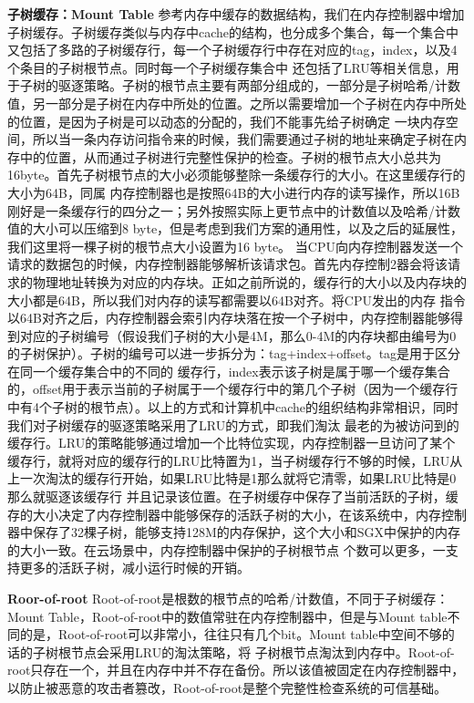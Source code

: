 \textbf{子树缓存：Mount Table}
参考内存中缓存的数据结构，我们在内存控制器中增加子树缓存。子树缓存类似与内存中cache的结构，也分成多个集合，每一个集合中又包括了多路的子树缓存行，每一个子树缓存行中存在对应的tag，index，以及4个条目的子树根节点。同时每一个子树缓存集合中
还包括了LRU等相关信息，用于子树的驱逐策略。子树的根节点主要有两部分组成的，一部分是子树哈希/计数值，另一部分是子树在内存中所处的位置。之所以需要增加一个子树在内存中所处的位置，是因为子树是可以动态的分配的，我们不能事先给子树确定
一块内存空间，所以当一条内存访问指令来的时候，我们需要通过子树的地址来确定子树在内存中的位置，从而通过子树进行完整性保护的检查。子树的根节点大小总共为16byte。首先子树根节点的大小必须能够整除一条缓存行的大小。在这里缓存行的大小为64B，同属
内存控制器也是按照64B的大小进行内存的读写操作，所以16B刚好是一条缓存行的四分之一；另外按照实际上更节点中的计数值以及哈希/计数值的大小可以压缩到8 byte，但是考虑到我们方案的通用性，以及之后的延展性，我们这里将一棵子树的根节点大小设置为16 byte。
当CPU向内存控制器发送一个请求的数据包的时候，内存控制器能够解析该请求包。首先内存控制2器会将该请求的物理地址转换为对应的内存块。正如之前所说的，缓存行的大小以及内存块的大小都是64B，所以我们对内存的读写都需要以64B对齐。将CPU发出的内存
指令以64B对齐之后，内存控制器会索引内存块落在按一个子树中，内存控制器能够得到对应的子树编号（假设我们子树的大小是4M，那么0-4M的内存块都由编号为0的子树保护）。子树的编号可以进一步拆分为：tag+index+offset。tag是用于区分在同一个缓存集合中的不同的
缓存行，index表示该子树是属于哪一个缓存集合的，offset用于表示当前的子树属于一个缓存行中的第几个子树（因为一个缓存行中有4个子树的根节点）。以上的方式和计算机中cache的组织结构非常相识，同时我们对子树缓存的驱逐策略采用了LRU的方式，即我们淘汰
最老的为被访问到的缓存行。LRU的策略能够通过增加一个比特位实现，内存控制器一旦访问了某个缓存行，就将对应的缓存行的LRU比特置为1，当子树缓存行不够的时候，LRU从上一次淘汰的缓存行开始，如果LRU比特是1那么就将它清零，如果LRU比特是0那么就驱逐该缓存行
并且记录该位置。在子树缓存中保存了当前活跃的子树，缓存的大小决定了内存控制器中能够保存的活跃子树的大小，在该系统中，内存控制器中保存了32棵子树，能够支持128M的内存保护，这个大小和SGX中保护的内存的大小一致。在云场景中，内存控制器中保护的子树根节点
个数可以更多，一支持更多的活跃子树，减小运行时候的开销。

\textbf{Roor-of-root}
Root-of-root是根数的根节点的哈希/计数值，不同于子树缓存：Mount Table，Root-of-root中的数值常驻在内存控制器中，但是与Mount table不同的是，Root-of-root可以非常小，往往只有几个bit。Mount  table中空间不够的话的子树根节点会采用LRU的淘汰策略，将
子树根节点淘汰到内存中。Root-of-root只存在一个，并且在内存中并不存在备份。所以该值被固定在内存控制器中，以防止被恶意的攻击者篡改，Root-of-root是整个完整性检查系统的可信基础。

